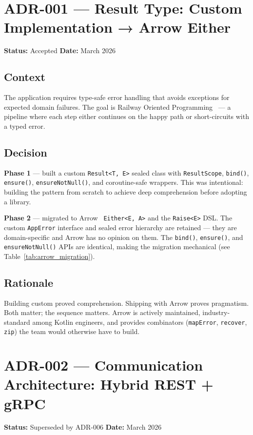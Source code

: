 \newpage
\section{ADR-001 — Result Type: Custom Implementation → Arrow Either}
\label{adr:001}
\textbf{Status:} Accepted \quad \textbf{Date:} March 2026

\subsection*{Context}
The application requires type-safe error handling that avoids exceptions for expected domain failures. The goal is Railway Oriented Programming~\cite{wlaschin2014rop} — a pipeline where each step either continues on the happy path or short-circuits with a typed error.

\subsection*{Decision}
\textbf{Phase 1} — built a custom \texttt{Result<T, E>} sealed class with \texttt{ResultScope}, \texttt{bind()}, \texttt{ensure()}, \texttt{ensureNotNull()}, and coroutine-safe wrappers. This was intentional: building the pattern from scratch to achieve deep comprehension before adopting a library.

\textbf{Phase 2} — migrated to Arrow~\cite{arrowkt2024} \texttt{Either<E, A>} and the \texttt{Raise<E>} DSL. The custom \texttt{AppError} interface and sealed error hierarchy are retained — they are domain-specific and Arrow has no opinion on them. The \texttt{bind()}, \texttt{ensure()}, and \texttt{ensureNotNull()} APIs are identical, making the migration mechanical (see Table~\ref{tab:arrow_migration}).

\subsection*{Rationale}
Building custom proved comprehension. Shipping with Arrow proves pragmatism. Both matter; the sequence matters. Arrow is actively maintained, industry-standard among Kotlin engineers, and provides combinators (\texttt{mapError}, \texttt{recover}, \texttt{zip}) the team would otherwise have to build.

\section{ADR-002 — Communication Architecture: Hybrid REST + gRPC}
\label{adr:002}
\textbf{Status:} Superseded by ADR-006 \quad \textbf{Date:} March 2026


